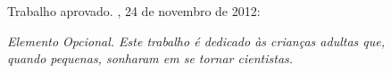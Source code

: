 \documentclass[12pt, openright,	oneside, a4paper, english, french, spanish, brazil]{abntex2}
\begin{document}
%
% 
%
\begin{folhadeaprovacao}

  \begin{center}
    {\ABNTEXchapterfont\large\imprimirautor}

    \vspace*{\fill}\vspace*{\fill}
    \begin{center}
      \ABNTEXchapterfont\bfseries\Large\imprimirtitulo
    \end{center}
    \vspace*{\fill}
    
    \hspace{.45\textwidth}
    \begin{minipage}{.5\textwidth}
        \imprimirpreambulo
    \end{minipage}%
    \vspace*{\fill}
   \end{center}
        
   Trabalho aprovado. \imprimirlocal, 24 de novembro de 2012:

      
   \begin{center}
    \vspace*{0.5cm}
    {\large\imprimirlocal}
    \par
    {\large\imprimirdata}
    \vspace*{1cm}
  \end{center}
  
\end{folhadeaprovacao}

\begin{dedicatoria}
   \vspace*{\fill}
   \centering
   \noindent
   \textit{Elemento Opcional. Este trabalho é dedicado às crianças adultas que,\\
   quando pequenas, sonharam em se tornar cientistas.} \vspace*{\fill}
\end{dedicatoria}
\end{document}
